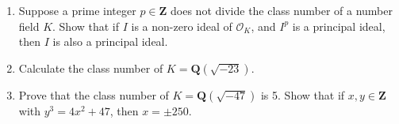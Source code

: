 \documentclass{article}
\begin{document}
\begin{enumerate}
    \item Suppose a prime integer $p \in \mathbf{Z}$ does not divide the class number of a number field $K$. Show that if $I$ is a non-zero ideal of $\mathcal{O}_K$, and $I^p$ is a principal ideal, then $I$ is also a principal ideal.

    \item Calculate the class number of $K = \mathbf{Q}(\sqrt{-23})$.

    \item Prove that the class number of $K = \mathbf{Q}(\sqrt{-47})$ is 5. Show that if $x, y \in \mathbf{Z}$ with $y^3 = 4x^2 + 47$, then $x = \pm 250$.
\end{enumerate}
\end{document}
